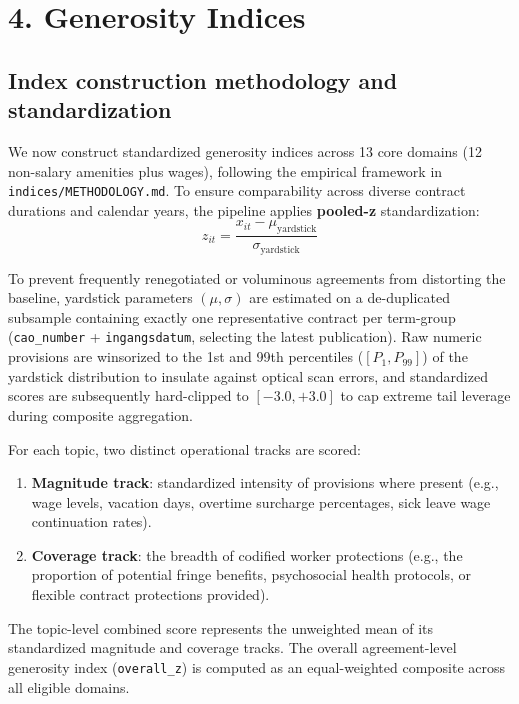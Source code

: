 \section*{4. Generosity Indices}
\label{sec:indices}

\subsection*{Index construction methodology and standardization}

We now construct standardized generosity indices across 13 core domains (12 non-salary amenities plus wages), following the empirical framework in \texttt{indices/METHODOLOGY.md}. To ensure comparability across diverse contract durations and calendar years, the pipeline applies \textbf{pooled-z} standardization:
\begin{equation}
    z_{it} = \frac{x_{it} - \mu_{\text{yardstick}}}{\sigma_{\text{yardstick}}}
\end{equation}

To prevent frequently renegotiated or voluminous agreements from distorting the baseline, yardstick parameters $(\mu, \sigma)$ are estimated on a de-duplicated subsample containing exactly one representative contract per term-group (\texttt{cao\_number} + \texttt{ingangsdatum}, selecting the latest publication). Raw numeric provisions are winsorized to the 1st and 99th percentiles ($[P_1, P_{99}]$) of the yardstick distribution to insulate against optical scan errors, and standardized scores are subsequently hard-clipped to $[-3.0, +3.0]$ to cap extreme tail leverage during composite aggregation.

For each topic, two distinct operational tracks are scored:
\begin{enumerate}
    \item \textbf{Magnitude track}: standardized intensity of provisions where present (e.g., wage levels, vacation days, overtime surcharge percentages, sick leave wage continuation rates).
    \item \textbf{Coverage track}: the breadth of codified worker protections (e.g., the proportion of potential fringe benefits, psychosocial health protocols, or flexible contract protections provided).
\end{enumerate}
The topic-level combined score represents the unweighted mean of its standardized magnitude and coverage tracks. The overall agreement-level generosity index (\texttt{overall\_z}) is computed as an equal-weighted composite across all eligible domains. 

